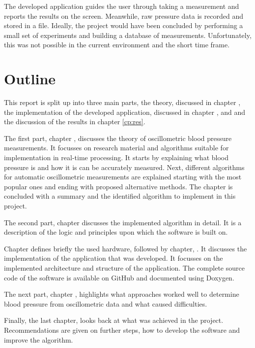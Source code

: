 The developed application guides the user through taking a measurement and reports the results on the screen. Meanwhile, raw pressure data is recorded and stored in a file. Ideally, the project would have been concluded by performing a small set of experiments and building a database of measurements. Unfortunately, this was not possible in the current environment and the short time frame. 

\section{Outline}
This report is split up into three main parts, the theory, discussed in chapter , the implementation of the developed application, discussed in chapter ,  and  and the discussion of the results in chapter \ref{cp:res}.

The first part, chapter , discusses the theory of oscillometric blood pressure measurements. It focusses on research material and algorithms suitable for implementation in real-time processing. It starts by explaining what blood pressure is and how it is can be accurately measured. Next, different algorithms for automatic oscillometric measurements are explained starting with the most popular ones and ending with proposed alternative methods. The chapter is concluded with a summary and the identified algorithm to implement in this project.

The second part, chapter  discusses the implemented algorithm in detail. It is a description of the logic and principles upon which the software is built on.

Chapter  defines briefly the used hardware, followed by chapter, . It discusses the implementation of the application that was developed. It focusses on the implemented architecture and structure of the application. The complete source code of the software is available on GitHub and documented using Doxygen.

The next part, chapter , highlights what approaches worked well to determine blood pressure from oscillometric data and what caused difficulties. 

Finally, the last chapter,  looks back at what was achieved in the project. Recommendations are given on further steps, how to develop the software and improve the algorithm. 


